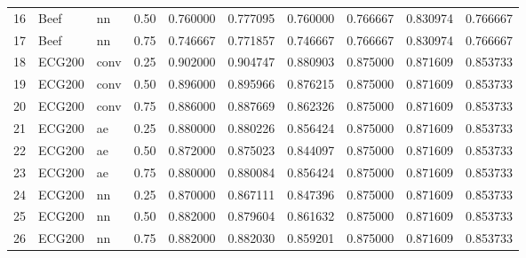 \begin{tabular}{lllrrrrrrr}
16 &      Beef &     nn &   0.50 &  0.760000 &     0.777095 &  0.760000 &  0.766667 &     0.830974 &  0.766667 \\
17 &      Beef &     nn &   0.75 &  0.746667 &     0.771857 &  0.746667 &  0.766667 &     0.830974 &  0.766667 \\
18 &    ECG200 &   conv &   0.25 &  0.902000 &     0.904747 &  0.880903 &  0.875000 &     0.871609 &  0.853733 \\
19 &    ECG200 &   conv &   0.50 &  0.896000 &     0.895966 &  0.876215 &  0.875000 &     0.871609 &  0.853733 \\
20 &    ECG200 &   conv &   0.75 &  0.886000 &     0.887669 &  0.862326 &  0.875000 &     0.871609 &  0.853733 \\
21 &    ECG200 &     ae &   0.25 &  0.880000 &     0.880226 &  0.856424 &  0.875000 &     0.871609 &  0.853733 \\
22 &    ECG200 &     ae &   0.50 &  0.872000 &     0.875023 &  0.844097 &  0.875000 &     0.871609 &  0.853733 \\
23 &    ECG200 &     ae &   0.75 &  0.880000 &     0.880084 &  0.856424 &  0.875000 &     0.871609 &  0.853733 \\
24 &    ECG200 &     nn &   0.25 &  0.870000 &     0.867111 &  0.847396 &  0.875000 &     0.871609 &  0.853733 \\
25 &    ECG200 &     nn &   0.50 &  0.882000 &     0.879604 &  0.861632 &  0.875000 &     0.871609 &  0.853733 \\
26 &    ECG200 &     nn &   0.75 &  0.882000 &     0.882030 &  0.859201 &  0.875000 &     0.871609 &  0.853733 \\
\bottomrule
\end{tabular}
